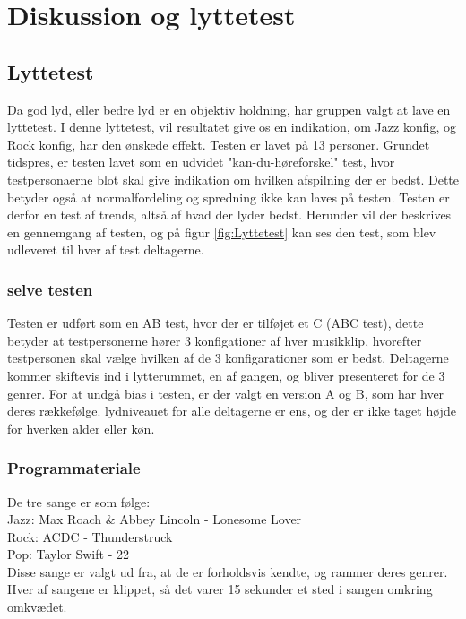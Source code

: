 \section{Diskussion og lyttetest}

\subsection{Lyttetest}
Da god lyd, eller bedre lyd er en objektiv holdning, har gruppen valgt at lave en lyttetest. I denne lyttetest, vil resultatet give os en indikation, om Jazz konfig, og Rock konfig, har den ønskede effekt. Testen er lavet på 13 personer. Grundet tidspres, er testen lavet som en udvidet "kan-du-høreforskel" test, hvor testpersonaerne blot skal give indikation om hvilken afspilning der er bedst. Dette betyder også at normalfordeling og spredning ikke kan laves på testen. Testen er derfor en test af trends, altså af hvad der lyder bedst. Herunder vil der beskrives en gennemgang af testen, og på figur \ref{fig:Lyttetest} kan ses den test, som blev udleveret til hver af test deltagerne.  
 
\subsubsection{selve testen}
Testen er udført som en AB test, hvor der er tilføjet et C (ABC test), dette betyder at testpersonerne hører 3 konfigationer af hver musikklip, hvorefter testpersonen skal vælge hvilken af de 3 konfigarationer som er bedst. Deltagerne kommer skiftevis ind i lytterummet, en af gangen, og bliver presenteret for de 3 genrer. For at undgå bias i testen, er der valgt en version A og B, som har hver deres rækkefølge. lydniveauet for alle deltagerne er ens, og der er ikke taget højde for hverken alder eller køn.    

\subsubsection{Programmateriale}
De tre sange er som følge: \\
Jazz: Max Roach \& Abbey Lincoln - Lonesome Lover \\
Rock: ACDC - Thunderstruck \\
Pop: Taylor Swift - 22 \\
Disse sange er valgt ud fra, at de er forholdsvis kendte, og rammer deres genrer. Hver af sangene er klippet, så det varer 15 sekunder et sted i sangen omkring omkvædet. 


